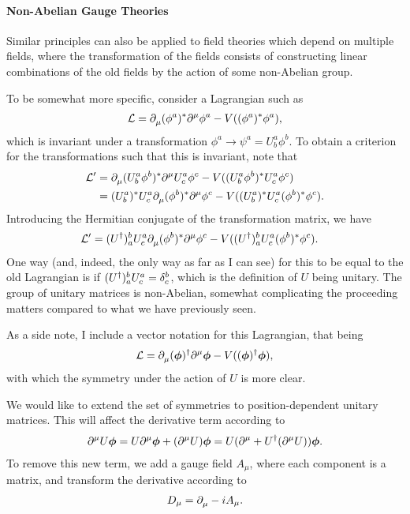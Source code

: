 \paragraph{Non-Abelian Gauge Theories}
Similar principles can also be applied to field theories which depend on multiple fields, where the transformation of the fields consists of constructing linear combinations of the old fields by the action of some non-Abelian group.

To be somewhat more specific, consider a Lagrangian such as
\begin{align*}
	\lag = \del{\mu}{\cc{(\phi^{a})}}\del[\mu]{}{\phi^{a}} - V(\cc{(\phi^{a})}\phi^{a}),
\end{align*}
which is invariant under a transformation $\phi^{a} \to \psi^{a} = U_{b}^{a}\phi^{b}$. To obtain a criterion for the transformations such that this is invariant, note that
\begin{align*}
	\lag^{\prime} &= \del{\mu}{\cc{(U_{b}^{a}\phi^{b})}}\del[\mu]{}{U_{c}^{a}\phi^{c}} - V(\cc{(U_{b}^{a}\phi^{b})}U_{c}^{a}\phi^{c}) \\
	              &= \cc{(U_{b}^{a})}U_{c}^{a}\del{\mu}{\cc{(\phi^{b})}}\del[\mu]{}{\phi^{c}} - V(\cc{(U_{b}^{a})}U_{c}^{a}\cc{(\phi^{b})}\phi^{c}).
\end{align*}
Introducing the Hermitian conjugate of the transformation matrix, we have
\begin{align*}
	\lag^{\prime} &= (U^{\dagger})_{a}^{b}U_{c}^{a}\del{\mu}{\cc{(\phi^{b})}}\del[\mu]{}{\phi^{c}} - V((U^{\dagger})_{a}^{b}U_{c}^{a}\cc{(\phi^{b})}\phi^{c}).
\end{align*}
One way (and, indeed, the only way as far as I can see) for this to be equal to the old Lagrangian is if $(U^{\dagger})_{a}^{b}U_{c}^{a} = \kdelta{c}{b}$, which is the definition of $U$ being unitary. The group of unitary matrices is non-Abelian, somewhat complicating the proceeding matters compared to what we have previously seen.

As a side note, I include a vector notation for this Lagrangian, that being
\begin{align*}
	\lag = \del{\mu}{(\vb*{\phi})^{\dagger}}\del[\mu]{}{\vb*{\phi}} - V((\vb*{\phi})^{\dagger}\vb*{\phi}),
\end{align*}
with which the symmetry under the action of $U$ is more clear.

We would like to extend the set of symmetries to position-dependent unitary matrices. This will affect the derivative term according to
\begin{align*}
	\del[\mu]{}{U\vb*{\phi}} = U\del[\mu]{}{\vb*{\phi}} + (\del[\mu]{}{U})\vb*{\phi} = U(\del[\mu]{}{} + U^{\dagger}(\del[\mu]{}{U}))\vb*{\phi}.
\end{align*}
To remove this new term, we add a gauge field $A_{\mu}$, where each component is a matrix, and transform the derivative according to
\begin{align*}
	D_{\mu} = \del{\mu}{} - iA_{\mu}.
\end{align*}

